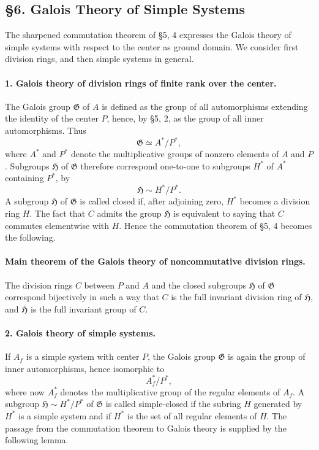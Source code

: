 \documentclass[11pt]{article}
\providecommand{\Gcal}{\mathfrak G}
\begin{document}
\clearpage

\subsection*{§6. Galois Theory of Simple Systems}

The sharpened commutation theorem of §5, 4 expresses the Galois theory of simple systems with respect to the center as ground domain. We consider first division rings, and then simple systems in general.

\paragraph{1. Galois theory of division rings of finite rank over the center.}
The Galois group \(\Gcal\) of \(A\) is defined as the group of all automorphisms extending the identity of the center \(P\), hence, by §5, 2, as the group of all inner automorphisms. Thus
\[
        \Gcal \simeq A^*/P^*,
\]
where \(A^*\) and \(P^*\) denote the multiplicative groups of nonzero elements of \(A\) and \(P\). Subgroups \(\mathfrak H\) of \(\Gcal\) therefore correspond one-to-one to subgroups \(H^*\) of \(A^*\) containing \(P^*\), by
\[
        \mathfrak H\sim H^*/P^* .
\]
A subgroup \(\mathfrak H\) of \(\Gcal\) is called closed if, after adjoining zero, \(H^*\) becomes a division ring \(H\). The fact that \(C\) admits the group \(\mathfrak H\) is equivalent to saying that \(C\) commutes elementwise with \(H\). Hence the commutation theorem of §5, 4 becomes the following.

\paragraph{Main theorem of the Galois theory of noncommutative division rings.}
The division rings \(C\) between \(P\) and \(A\) and the closed subgroups \(\mathfrak H\) of \(\Gcal\) correspond bijectively in such a way that \(C\) is the full invariant division ring of \(\mathfrak H\), and \(\mathfrak H\) is the full invariant group of \(C\).

\paragraph{2. Galois theory of simple systems.}
If \(A_f\) is a simple system with center \(P\), the Galois group \(\Gcal\) is again the group of inner automorphisms, hence isomorphic to
\[
        A_f^*/P^*,
\]
where now \(A_f^*\) denotes the multiplicative group of the regular elements of \(A_f\). A subgroup \(\mathfrak H\sim H^*/P^*\) of \(\Gcal\) is called simple-closed if the subring \(H\) generated by \(H^*\) is a simple system and if \(H^*\) is the set of all regular elements of \(H\). The passage from the commutation theorem to Galois theory is supplied by the following lemma.
\end{document}
